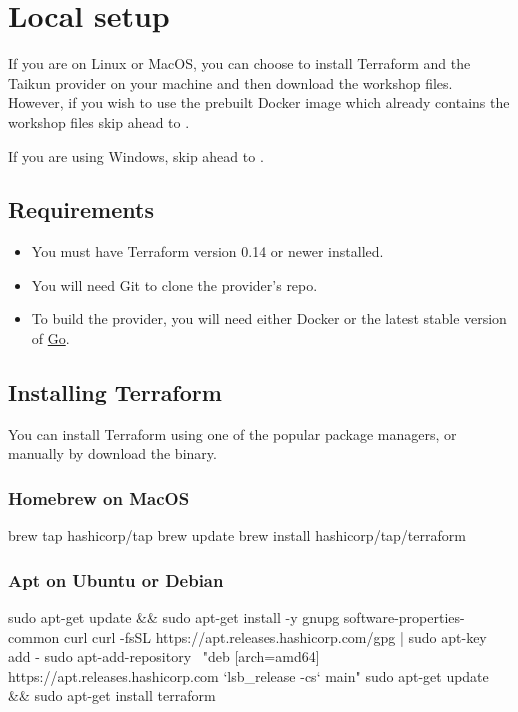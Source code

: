 \section{Local setup}

If you are on Linux or MacOS,
you can choose to install Terraform and the Taikun provider on your machine and
then download the workshop files.
However, if you wish to use the prebuilt Docker image which already contains
the workshop files skip ahead to .

\begin{warn}
If you are using Windows, skip ahead to .
\end{warn}

\subsection{Requirements}
\begin{itemize}
  \item You must have Terraform version 0.14 or newer installed.
  \item You will need Git to clone the provider's repo.
  \item To build the provider, you will need either Docker or
    the latest stable version of \href{https://golang.org/dl/}{Go}.
\end{itemize}

\subsection{Installing Terraform}
You can install Terraform using one of the popular package managers, or manually by
download the binary.
\subsubsection{Homebrew on MacOS}
\begin{shell}
brew tap hashicorp/tap
brew update
brew install hashicorp/tap/terraform
\end{shell}

\subsubsection{Apt on Ubuntu or Debian}
\begin{shell}
sudo apt-get update && sudo apt-get install -y gnupg software-properties-common curl
curl -fsSL https://apt.releases.hashicorp.com/gpg | sudo apt-key add -
sudo apt-add-repository \
"deb [arch=amd64] https://apt.releases.hashicorp.com `lsb_release -cs` main"
sudo apt-get update && sudo apt-get install terraform
\end{shell}

